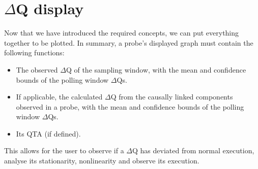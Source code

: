 \section{$\Delta$Q display}
    Now that we have introduced the required concepts, we can put everything together to be plotted. In summary, a probe's displayed graph must contain the following functions:
    \begin{itemize}
        \item The observed $\Delta$Q of the sampling window, with the mean and confidence bounds of the polling window $\Delta$Qs.
        \item If applicable, the calculated $\Delta$Q from the causally linked components observed in a probe, with the mean and confidence bounds of the polling window $\Delta$Qs.
        \item Its QTA (if defined).
    \end{itemize}
    This allows for the user to observe if a $\Delta$Q has deviated from normal execution, analyse its stationarity, nonlinearity and observe its execution.

